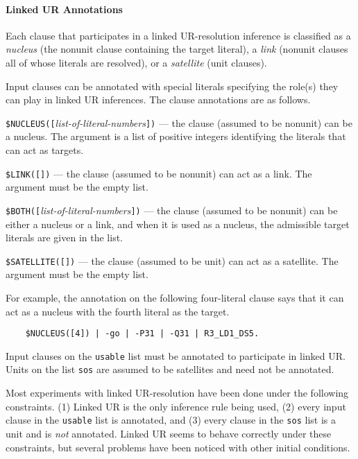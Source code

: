 \documentclass[11pt]{article}
\begin{document}
\paragraph{Linked UR Annotations} \strut

\noindent
Each clause that participates in a linked UR-resolution inference
is classified as
a \emph{nucleus} (the nonunit clause containing the target literal),
a \emph{link} (nonunit clauses all of whose literals are resolved),
or a \emph{satellite} (unit clauses).

Input clauses can be annotated with special literals
specifying the role(s) they can play in linked UR inferences.
The clause annotations are as follows.

\noindent
\verb:$NUCLEUS([:\emph{list-of-literal-numbers}\verb:]): ---
the clause (assumed to be nonunit) can be a nucleus.
The argument is a list of positive integers identifying the
literals that can act as targets.

\noindent
\verb:$LINK([]): ---
the clause (assumed to be nonunit) can act as a link.
The argument must be the empty list.

\noindent
\verb:$BOTH([:\emph{list-of-literal-numbers}\verb:]): ---
the clause (assumed to be nonunit) can be either a nucleus or a link,
and when it is used as a nucleus, the admissible target literals
are given in the list.

\noindent
\verb:$SATELLITE([]): ---
the clause (assumed to be unit) can act as a satellite.
The argument must be the empty list.

For example, the annotation on the following four-literal clause says that
it can act as a nucleus with the fourth literal as the target.

{\small
\begin{verbatim}
    $NUCLEUS([4]) | -go | -P31 | -Q31 | R3_LD1_DS5.
\end{verbatim}
}
\noindent
Input clauses on the \verb:usable: list must be annotated
to participate in linked UR.  Units on the list \verb:sos:
are assumed to be satellites and need not be annotated.

Most experiments with linked UR-resolution have been done
under the following constraints.  (1) Linked UR is the only
inference rule being used, (2) every input clause in the
\verb:usable: list is annotated, and (3) every clause
in the \verb:sos: list is a unit and is \emph{not}
annotated.  Linked UR seems to behave correctly under
these constraints, but several problems have been noticed
with other initial conditions.
\end{document}
